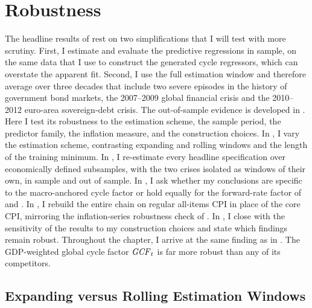 \chapter{Robustness}
\label{ch:robustness}

The headline results of  rest on two simplifications that I
will test with more scrutiny. First, I estimate and evaluate the
predictive regressions in sample, on the same data that I use to construct the
generated cycle regressors, which can overstate the apparent fit. Second, I use
the full estimation window and therefore average over three decades that include
two severe episodes in the history of government bond markets, the
2007--2009 global financial crisis and the 2010--2012 euro-area sovereign-debt
crisis. The out-of-sample evidence is developed in . Here I
test its robustness to the estimation scheme, the sample period, the predictor
family, the inflation measure, and the construction choices. In
, I vary the estimation scheme, contrasting expanding
and rolling windows and the length of the training minimum. In
, I re-estimate every headline
specification over economically defined subsamples, with the two crises isolated
as windows of their own, in sample and out of sample. In , I ask whether my
conclusions are specific to the macro-anchored cycle factor or hold equally for
the forward-rate factor of \citet{cochrane2005} and \citet{dahlquist2013}.
In , I rebuild the entire chain on regular all-items CPI in
place of the core CPI, mirroring the inflation-series robustness check of
\citet{cieslak2015}. In , I close with the sensitivity of the results to my
construction choices and state which findings remain robust. Throughout the chapter, I arrive at the same finding as in
. The GDP-weighted global cycle factor $\mathit{GCF}_{t}$ is far more
robust than any of its competitors.

\section{Expanding versus Rolling Estimation Windows}
\label{sec:rob-oos-scheme}

